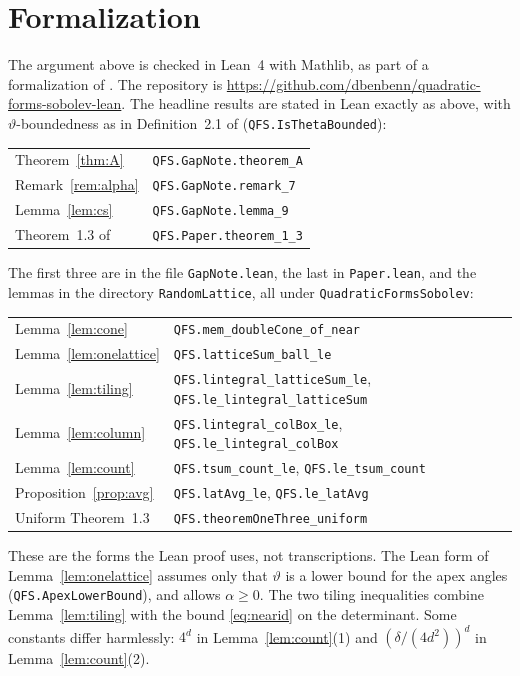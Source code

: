 \documentclass[11pt]{amsart}
\theoremstyle{remark}
\newcommand{\1}{\mathbf{1}}
\begin{document}
\section{Formalization}\label{sec:lean}

The argument above is checked in Lean~4 with Mathlib, as part of a formalization of \cite{BKS}.
The repository is \url{https://github.com/dbenbenn/quadratic-forms-sobolev-lean}. The headline
results are stated in Lean exactly as above, with $\vartheta$-boundedness as in Definition~2.1 of
\cite{BKS} (\texttt{QFS.IsThetaBounded}):

\begin{center}
\begin{tabular}{ll}
Theorem~\ref{thm:A} & \texttt{QFS.GapNote.theorem\_A}\\
Remark~\ref{rem:alpha} & \texttt{QFS.GapNote.remark\_7}\\
Lemma~\ref{lem:cs} & \texttt{QFS.GapNote.lemma\_9}\\
Theorem~1.3 of \cite{BKS} & \texttt{QFS.Paper.theorem\_1\_3}
\end{tabular}
\end{center}

The first three are in the file \texttt{GapNote.lean}, the last in \texttt{Paper.lean}, and the
lemmas in the directory \texttt{RandomLattice}, all under \texttt{QuadraticFormsSobolev}:

\begin{center}
\begin{tabular}{ll}
Lemma~\ref{lem:cone} & \texttt{QFS.mem\_doubleCone\_of\_near}\\
Lemma~\ref{lem:onelattice} & \texttt{QFS.latticeSum\_ball\_le}\\
Lemma~\ref{lem:tiling} & \texttt{QFS.lintegral\_latticeSum\_le}, \texttt{QFS.le\_lintegral\_latticeSum}\\
Lemma~\ref{lem:column} & \texttt{QFS.lintegral\_colBox\_le}, \texttt{QFS.le\_lintegral\_colBox}\\
Lemma~\ref{lem:count} & \texttt{QFS.tsum\_count\_le}, \texttt{QFS.le\_tsum\_count}\\
Proposition~\ref{prop:avg} & \texttt{QFS.latAvg\_le}, \texttt{QFS.le\_latAvg}\\
Uniform Theorem~1.3 & \texttt{QFS.theoremOneThree\_uniform}
\end{tabular}
\end{center}

These are the forms the Lean proof uses, not transcriptions. The Lean form of
Lemma~\ref{lem:onelattice} assumes only that $\vartheta$ is a lower bound for the apex angles
(\texttt{QFS.ApexLowerBound}), and allows $\alpha\ge0$. The two tiling inequalities combine Lemma~\ref{lem:tiling} with the bound
\eqref{eq:nearid} on the determinant. Some constants differ harmlessly: $4^d$ in
Lemma~\ref{lem:count}(1) and $(\delta/(4d^2))^d$ in Lemma~\ref{lem:count}(2).
\end{document}
